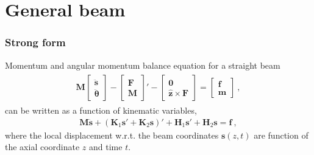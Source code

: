 \documentclass[letterpaper,10pt,english]{jupyterBook}
\begin{document}
\section{General beam}
\label{\detokenize{ch/solids/small-displacements-fem-beams-general:general-beam}}\label{\detokenize{ch/solids/small-displacements-fem-beams-general:solid-mechanics-intro-small-displacements-beam-fem-general}}\label{\detokenize{ch/solids/small-displacements-fem-beams-general::doc}}\subsubsection*{Strong form}

\sphinxAtStartPar
Momentum and angular momentum balance equation for a straight beam
\begin{equation*}
\begin{split}\begin{aligned}
  \mathbf{M} \begin{bmatrix} \ddot{\mathbf{s}} \\ \ddot{\boldsymbol\theta} \end{bmatrix} - \begin{bmatrix} \mathbf{F} \\ \mathbf{M} \end{bmatrix}' - \begin{bmatrix} \mathbf{0} \\ \hat{\mathbf{z}} \times \mathbf{F} \end{bmatrix} = \begin{bmatrix} \mathbf{f} \\ \mathbf{m}  \end{bmatrix} \ ,
\end{aligned}\end{split}
\end{equation*}
\sphinxAtStartPar
can be written as a function of kinematic variables,
\begin{equation*}
\begin{split}\mathbf{M} \ddot{\mathbf{s}} + \left( \mathbf{K}_1 \mathbf{s}' + \mathbf{K}_2 \mathbf{s} \right)' + \mathbf{H}_1 \mathbf{s}' + \mathbf{H}_2 \mathbf{s} = \mathbf{f} \ ,\end{split}
\end{equation*}
\sphinxAtStartPar
where the local displacement w.r.t. the beam coordinates \(\mathbf{s}(z,t)\) are function of the axial coordinate \(z\) and time \(t\).
\end{document}
